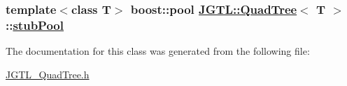 \hypertarget{class_j_g_t_l_1_1_quad_tree_5e72fbf6f44222a8a1aa51abb91715e8}{
\subsubsection[stubPool]{\setlength{\rightskip}{0pt plus 5cm}template$<$class T$>$ boost::pool \hyperlink{class_j_g_t_l_1_1_quad_tree}{JGTL::Quad\-Tree}$<$ T $>$::\hyperlink{class_j_g_t_l_1_1_quad_tree_5e72fbf6f44222a8a1aa51abb91715e8}{stub\-Pool}}}
\label{class_j_g_t_l_1_1_quad_tree_5e72fbf6f44222a8a1aa51abb91715e8}




The documentation for this class was generated from the following file:\begin{CompactItemize}
\item 
\hyperlink{_j_g_t_l___quad_tree_8h}{JGTL\_\-Quad\-Tree.h}\end{CompactItemize}
